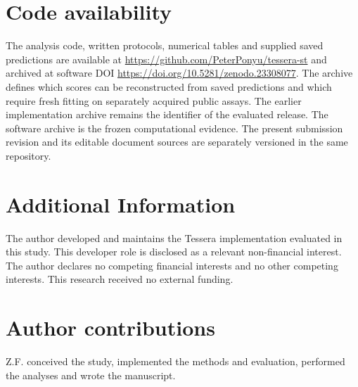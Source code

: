 \documentclass[11pt]{article}
\begin{document}
\section*{Code availability}
The analysis code, written protocols, numerical tables and supplied saved predictions are available at \url{https://github.com/PeterPonyu/tessera-st} and archived at software DOI \url{https://doi.org/10.5281/zenodo.23308077}. The archive defines which scores can be reconstructed from saved predictions and which require fresh fitting on separately acquired public assays. The earlier implementation archive remains the identifier of the evaluated release.
The software archive is the frozen computational evidence. The present submission revision and its editable document sources are separately versioned in the same repository.


\section*{Additional Information}
The author developed and maintains the Tessera implementation evaluated in this study. This developer role is disclosed as a relevant non-financial interest. The author declares no competing financial interests and no other competing interests. This research received no external funding.
{\small\setlength{\bibsep}{2pt}\par}

\section*{Author contributions}
Z.F. conceived the study, implemented the methods and evaluation, performed the analyses and wrote the manuscript.
\end{document}
